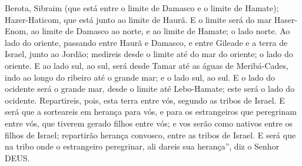 {Berota, Sibraim (que está entre o limite de Damasco e o limite de Hamate); Hazer-Haticom, que está junto ao limite de Haurã.
E o limite será do mar
{} Haser-Enom, ao limite de Damasco ao norte, e ao limite de Hamate;
{} o lado norte.
Ao lado do oriente, passando entre Haurã e Damasco, e entre Gileade e a terra de Israel, junto ao Jordão; medireis desde o limite até do mar do oriente;
{} o lado do oriente.
E ao lado sul, ao sul, será desde Tamar até as águas de Meribá-Cades, indo ao longo do ribeiro até o grande mar; e
{} o lado sul, ao sul.
E o lado do ocidente será o grande mar, desde o limite até Lebo-Hamate; este será o lado do ocidente.
Repartireis, pois, esta terra entre vós, segundo as tribos de Israel.
E será que a sorteareis em herança para vós, e para os estrangeiros que peregrinam entre vós, que tiverem gerado filhos entre vós; e vos serão como nativos entre os filhos de Israel; repartirão herança convosco, entre as tribos de Israel.
E será que na tribo onde o estrangeiro peregrinar, ali
{} dareis sua herança”, diz o Senhor DEUS.

}
